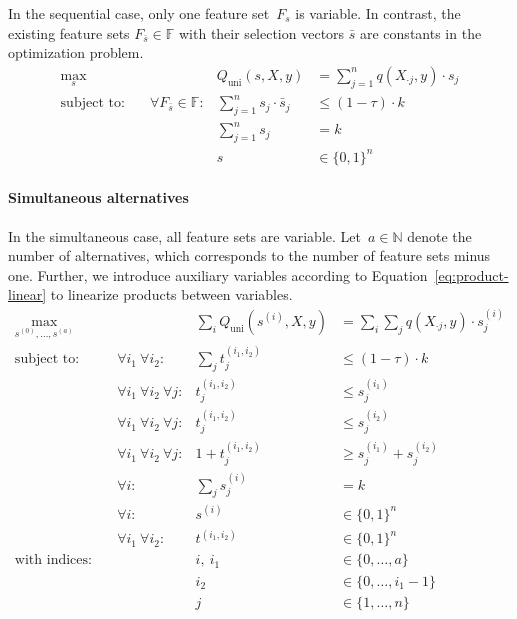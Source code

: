 \documentclass{article}
\theoremstyle{definition}
\begin{document}
In the sequential case, only one feature set~$F_s$ is variable.
In contrast, the existing feature sets $F_{\bar{s}} \in \mathbb{F}$ with their selection vectors $\bar{s}$ are constants in the optimization problem.
%
\begin{equation}
	\begin{aligned}
		\max_s &\quad & Q_{\text{uni}}(s,X,y) &= \sum_{j=1}^{n} q(X_{\cdot{}j},y) \cdot s_j \\
		\text{subject to:} &\quad \forall F_{\bar{s}} \in \mathbb{F} :& \sum_{j=1}^n s_j \cdot \bar{s}_j &\leq (1 - \tau) \cdot k \\
		&\quad & \sum_{j=1}^n s_j &= k \\
		&\quad & s &\in \{0,1\}^n
	\end{aligned}
	\label{eq:afs-sequential-complete}
\end{equation}
%
\paragraph{Simultaneous alternatives}

In the simultaneous case, all feature sets are variable.
Let~$a \in \mathbb{N}$ denote the number of alternatives, which corresponds to the number of feature sets minus one.
Further, we introduce auxiliary variables according to Equation~\ref{eq:product-linear} to linearize products between variables.
%
\begin{equation}
	\begin{aligned}
		\max_{s^{(0)}, \dots, s^{(a)}} &\quad & \sum_i Q_{\text{uni}}(s^{(i)},X,y) &= \sum_i \sum_j q(X_{\cdot{}j},y) \cdot s^{(i)}_j\\
		\text{subject to:} &\quad \forall i_1~\forall i_2 :& \sum_j t^{(i_1,i_2)}_j &\leq (1 - \tau) \cdot k \\
		&\quad \forall i_1~\forall i_2~\forall j :& t^{(i_1,i_2)}_j &\leq s^{(i_1)}_j \\
		&\quad \forall i_1~\forall i_2~\forall j :& t^{(i_1,i_2)}_j &\leq s^{(i_2)}_j \\
		&\quad \forall i_1~\forall i_2~\forall j :& 1 + t^{(i_1,i_2)}_j &\geq s^{(i_1)}_j + s^{(i_2)}_j \\
		&\quad \forall i :& \sum_j s^{(i)}_j &= k \\
		&\quad \forall i :& s^{(i)} &\in \{0,1\}^n \\
		&\quad \forall i_1~\forall i_2 :& t^{(i_1,i_2)} &\in \{0,1\}^n \\
		\text{with indices:} &\quad & i,~i_1 &\in \{0, \dots, a\} \\
		&\quad & i_2 &\in \{0, \dots, i_1-1\} \\
		&\quad & j &\in \{1, \dots, n\}
	\end{aligned}
	\label{eq:afs-simultaneous-complete}
\end{equation}
\end{document}
